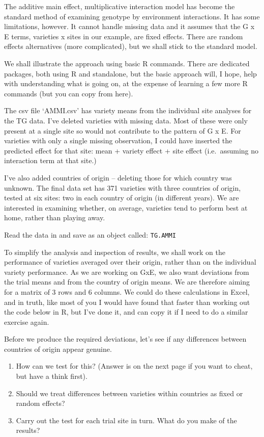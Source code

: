 \documentclass[
]{book}
\begin{document}
The additive main effect, multiplicative interaction model has become the standard method of examining genotype by environment interactions. It has some limitations, however. It cannot handle missing data and it assumes that the G x E terms, varieties x sites in our example, are fixed effects. There are random effects alternatives (more complicated), but we shall stick to the standard model.

We shall illustrate the approach using basic R commands. There are dedicated packages, both using R and standalone, but the basic approach will, I hope, help with understanding what is going on, at the expense of learning a few more R commands (but you can copy from here).

The csv file `AMMI.csv' has variety means from the individual site analyses for the TG data. I've deleted varieties with missing data. Most of these were only present at a single site so would not contribute to the pattern of G x E. For varieties with only a single missing observation, I could have inserted the predicted effect for that site: mean + variety effect + site effect (i.e.~assuming no interaction term at that site.)

I've also added countries of origin -- deleting those for which country was unknown. The final data set has 371 varieties with three countries of origin, tested at six sites: two in each country of origin (in different years). We are interested in examining whether, on average, varieties tend to perform best at home, rather than playing away.

Read the data in and save as an object called: \texttt{TG.AMMI}

To simplify the analysis and inspection of results, we shall work on the performance of varieties averaged over their origin, rather than on the individual variety performance. As we are working on GxE, we also want deviations from the trial means and from the country of origin means. We are therefore aiming for a matrix of 3 rows and 6 columns. We could do these calculations in Excel, and in truth, like most of you I would have found that faster than working out the code below in R, but I've done it, and can copy it if I need to do a similar exercise again.

Before we produce the required deviations, let's see if any differences between countries of origin appear genuine.

\begin{enumerate}
\def\labelenumi{\arabic{enumi}.}
\item
  How can we test for this? (Answer is on the next page if you want to cheat, but have a think first).
\item
  Should we treat differences between varieties within countries as fixed or random effects?
\item
  Carry out the test for each trial site in turn. What do you make of the results?
\end{enumerate}
\end{document}
